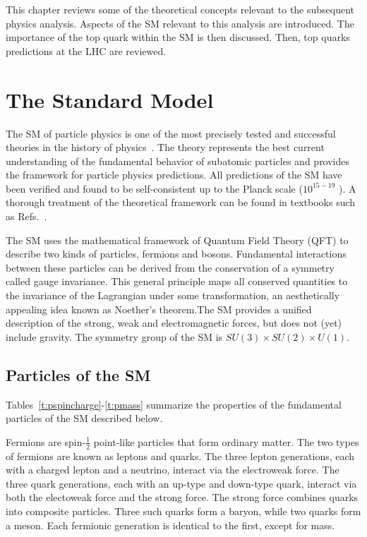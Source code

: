 

This chapter reviews some of the theoretical concepts relevant to the subsequent physics analysis. Aspects of the SM relevant to this analysis are introduced. The importance of the top quark within the SM is then discussed. Then, top quarks predictions at the LHC are reviewed.

\section{The Standard Model}

The SM of particle physics is one of the most precisely tested and successful theories in the history of physics~\cite{peskin}. The theory represents the best current understanding of the fundamental behavior of subatomic particles and provides the framework for particle physics predictions. All predictions of the SM have been verified and found to be self-consistent up to the Planck scale ($10^{15-19}$ \gev). A thorough treatment of the theoretical framework can be found in textbooks such as Refs.~\cite{peskin,halzen1984quarks,PDG}.

The SM uses the mathematical framework of Quantum Field Theory (QFT) to describe two kinds of particles, fermions and bosons. Fundamental interactions between these particles can be derived from the conservation of a symmetry called gauge invariance. This general principle maps all conserved quantities to the invariance of the Lagrangian under some transformation, an aesthetically appealing idea known as Noether's theorem.The SM provides a unified description of the strong, weak and electromagnetic forces, but does not (yet) include gravity. The symmetry group of the SM is $SU(3)\times SU(2)\times U(1)$.
\subsection{Particles of the SM}

Tables~\ref{t:pspincharge}-\ref{t:pmass} summarize the properties of the fundamental particles of the SM described below.

Fermions are spin-$\frac{1}{2}$ point-like particles that form ordinary matter. The two types of fermions are known as leptons and quarks. The three lepton generations, each with a charged lepton and a neutrino, interact via the electroweak force. The three quark generations, each with an up-type and down-type quark, interact via both the electoweak force and the strong force. The strong force combines quarks into composite particles. Three such quarks form a baryon, while two quarks form a meson. Each fermionic generation is identical to the first, except for mass. 

